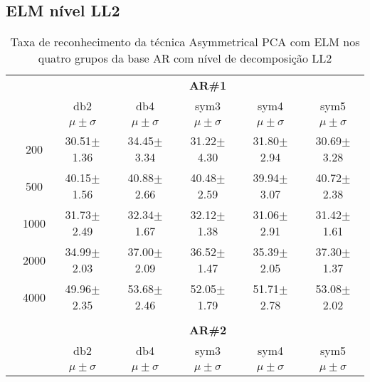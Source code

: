 \subsection{ELM nível LL2}


\begin{table}[H]
	\centering
    \normalsize
	\caption{Taxa de reconhecimento da técnica Asymmetrical PCA com ELM nos quatro grupos da base AR com nível de decomposição LL2}
	\begin{tabular}{|c|c|c c c c c|}
\cline{3-7}
\multicolumn{2}{c|}{\multirow{3}{*}{}} & \multicolumn{5}{c|}{\textbf{AR\#1}}   \\\cline{3-7} 
\multicolumn{2}{c|}{}  & db2 & db4 & sym3 & sym4 & sym5 \\\cline{3-7}%
\multicolumn{2}{c|}{}& $\mu \pm \sigma$ & $\mu \pm \sigma$ & $\mu \pm \sigma$ & $\mu \pm \sigma$ & $\mu \pm \sigma$ \\\hline


\multicolumn{1}{|c|}{ \multirow{5}{*}{\rotatebox[origin=c]{90}{\textbf{Neurônios}}} }
&200	&30.51$\pm$1.36	&34.45$\pm$3.34	&31.22$\pm$4.30	&31.80$\pm$2.94	&30.69$\pm$3.28\\\cline{2-7}
&500	&40.15$\pm$1.56	&40.88$\pm$2.66	&40.48$\pm$2.59	&39.94$\pm$3.07	&40.72$\pm$2.38\\\cline{2-7}
&1000	&31.73$\pm$2.49	&32.34$\pm$1.67	&32.12$\pm$1.38	&31.06$\pm$2.91	&31.42$\pm$1.61\\\cline{2-7}
&2000	&34.99$\pm$2.03	&37.00$\pm$2.09	&36.52$\pm$1.47	&35.39$\pm$2.05	&37.30$\pm$1.37\\\cline{2-7}
&4000	&49.96$\pm$2.35	&53.68$\pm$2.46	&52.05$\pm$1.79	&51.71$\pm$2.78	&53.08$\pm$2.02


\\\midrule%

\multicolumn{7}{c}{}\\ 

\cline{3-7}
\multicolumn{2}{c|}{\multirow{3}{*}{}} & \multicolumn{5}{c|}{\textbf{AR\#2}}   \\\cline{3-7} 

\multicolumn{2}{c|}{}  & db2 & db4 & sym3 & sym4 & sym5 \\\cline{3-7}
\multicolumn{2}{c|}{}& $\mu \pm \sigma$ & $\mu \pm \sigma$ & $\mu \pm \sigma$ & $\mu \pm \sigma$ & $\mu \pm \sigma$ \\\hline



\end{tabular}
\end{table}
